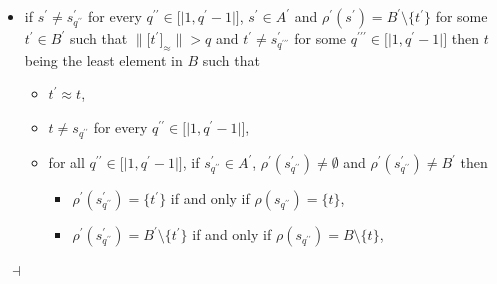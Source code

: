 \documentclass[draft]{article}
\newenvironment{proof}{{\bf Proof:}}{~$\dashv$\\}
\def\lsem{{\lbrack\mid}}
\def\rsem{{\mid\rbrack}}
\begin{document}
\begin{proof}
\begin{itemize}
%
%
\begin{itemize}
%
%
\item $t^{\prime}{\approx}t$,
%
%
\item $t{\not=}s_{q^{\prime\prime}}$ for every $q^{\prime\prime}{\in}\lsem1,q^{\prime}{-}1\rsem$,
%
%
\item for all $q^{\prime\prime}{\in}\lsem1,q^{\prime}{-}1\rsem$, if $s^{\prime}_{q^{\prime\prime}}{\in}A^{\prime}$, $\rho^{\prime}(s^{\prime}_{q^{\prime\prime}}){\not=}\emptyset$ and $\rho^{\prime}(s^{\prime}_{q^{\prime\prime}}){\not=}B^{\prime}$ then
%
%
\begin{itemize}
%
%
\item $\rho^{\prime}(s^{\prime}_{q^{\prime\prime}}){=}\{t^{\prime}\}$ if and only if $\rho(s_{q^{\prime\prime}}){=}\{t\}$,
%
%
\item $\rho^{\prime}(s^{\prime}_{q^{\prime\prime}}){=}B^{\prime}{\setminus}\{t^{\prime}\}$ if and only if $\rho(s_{q^{\prime\prime}}){=}B{\setminus}\{t\}$,
%
%
\end{itemize}
%
%
\end{itemize}
%
%
the second player picks the least element in ${\rho}^{{-}1}(\{t\}){\setminus}\{s_{1},\ldots,s_{q^{\prime}{-}1}\}$,
%
%
\item if $s^{\prime}{\not=}s^{\prime}_{q^{\prime\prime}}$ for every $q^{\prime\prime}{\in}\lsem1,q^{\prime}{-}1\rsem$, $s^{\prime}{\in}A^{\prime}$ and $\rho^{\prime}(s^{\prime}){=}B^{\prime}{\setminus}\{t^{\prime}\}$ for some $t^{\prime}{\in}B^{\prime}$ such that ${\parallel}\lbrack t^{\prime}\rbrack_{\approx}{\parallel}{>}q$ and $t^{\prime}{\not=}s^{\prime}_{q^{\prime\prime\prime}}$ for some $q^{\prime\prime\prime}{\in}\lsem1,q^{\prime}{-}1\rsem$ then $t$ being the least element in $B$ such that
%
%
\begin{itemize}
%
%
\item $t^{\prime}{\approx}t$,
%
%
\item $t{\not=}s_{q^{\prime\prime}}$ for every $q^{\prime\prime}{\in}\lsem1,q^{\prime}{-}1\rsem$,
%
%
\item for all $q^{\prime\prime}{\in}\lsem1,q^{\prime}{-}1\rsem$, if $s^{\prime}_{q^{\prime\prime}}{\in}A^{\prime}$, $\rho^{\prime}(s^{\prime}_{q^{\prime\prime}}){\not=}\emptyset$ and $\rho^{\prime}(s^{\prime}_{q^{\prime\prime}}){\not=}B^{\prime}$ then
%
%
\begin{itemize}
%
%
\item $\rho^{\prime}(s^{\prime}_{q^{\prime\prime}}){=}\{t^{\prime}\}$ if and only if $\rho(s_{q^{\prime\prime}}){=}\{t\}$,
%
%
\item $\rho^{\prime}(s^{\prime}_{q^{\prime\prime}}){=}B^{\prime}{\setminus}\{t^{\prime}\}$ if and only if $\rho(s_{q^{\prime\prime}}){=}B{\setminus}\{t\}$,

\end{itemize}
\end{itemize}
\end{itemize}
\end{proof}
\end{document}
